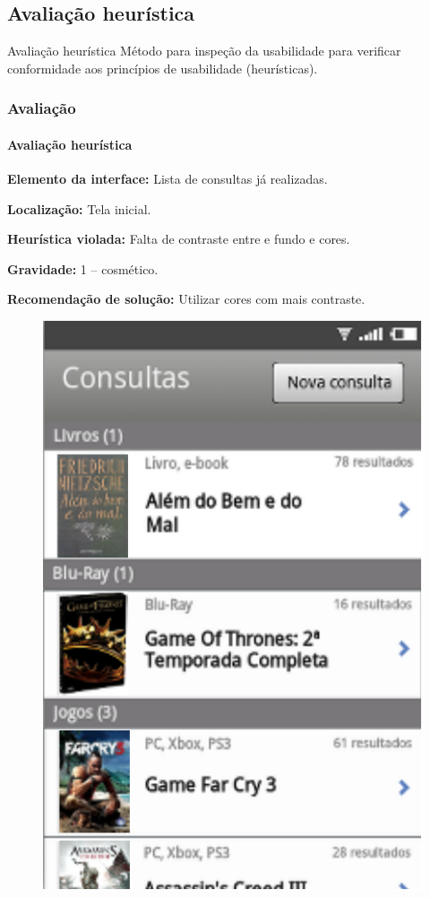 \documentclass[14pt,beamer]{beamer}
\begin{document}
\subsection{Avaliação heurística}
\begin{frame}
    \begin{block}{Avaliação heurística}
        Método para inspeção da usabilidade para verificar conformidade
        aos princípios de usabilidade (heurísticas).
    \end{block}
\end{frame}
\begin{frame}
	\frametitle{Avaliação}
	\framesubtitle{Avaliação heurística}
    
\par \noindent \textbf{Elemento da interface:} Lista de consultas já realizadas.
\par \noindent \textbf{Localização:} Tela inicial.
\par \noindent \textbf{Heurística violada:} Falta de contraste entre e fundo e cores.
\par \noindent \textbf{Gravidade:} 1 -- cosmético.
\par \noindent \textbf{Recomendação de solução:} Utilizar cores com mais contraste.

            \begin{figure}
                \centering
                \includegraphics[scale=.27]{tela/TelaHistorico}
            \end{figure}
            

\end{frame}
\end{document}

